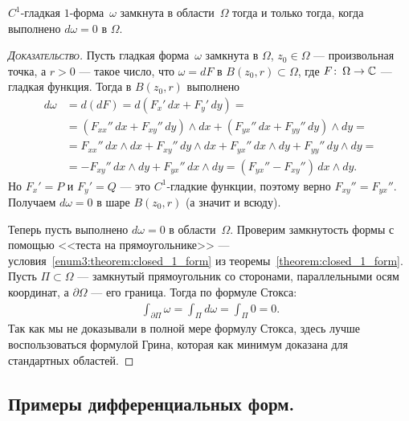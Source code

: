 \documentclass[../complex-analysis.tex]{subfiles}
\begin{document}
\begin{thm}
 \label{theorem:smooth_form_closed}
 $ C^{1} $-гладкая $ 1 $-форма~$ \omega $ замкнута в области~$ \Omega $ тогда и только тогда, когда выполнено $ d \omega = 0 $ в $ \Omega $.
\end{thm}
\begin{proof}[\normalfont\textsc{Доказательство}]
 Пусть гладкая форма~$ \omega $ замкнута в $ \Omega $, $ z_0 \in \Omega $ --- произвольная точка, а $ r > 0 $ --- такое число, что $ \omega = d F $ в $ B(z_0,r) \subset \Omega $, где $ F \colon\,\Omega\to\mathbb{C} $ --- гладкая функция. Тогда в $ B(z_0,r) $ выполнено
 \begin{align*}
  d\omega&=d(dF) = d \left( F_x'\,dx + F_y'\,dy \right) = \\
  &= \left( F_{x x}''\,dx + F_{x y}''\,dy \right)\land dx + \left( F_{y x}''\,dx + F_{y y}''\,dy \right)\land dy = \\
  &= F_{x x}''\,dx \land dx + F_{xy}''\,dy \land dx + F_{yx}''\,dx\land dy + F_{y y}''\,dy \land dy = \\
  &= -F_{xy}''\,dx\land dy + F_{yx}''\,dx \land dy = (F_{yx}'' - F_{xy}'')\,dx\land dy.
 \end{align*} Но $ F_x' = P $ и $ F_y' = Q $ --- это $ C^{1} $-гладкие функции, поэтому верно $ F_{xy}'' = F_{yx}'' $. Получаем $ d\omega=0 $ в шаре $ B(z_0,r) $ (а значит и всюду).

 Теперь пусть выполнено $d \omega = 0$ в области~$\Omega$. Проверим замкнутость формы с помощью <<теста на прямоугольнике>> --- условия~\ref{enum3:theorem:closed_1_form} из теоремы~\ref{theorem:closed_1_form}. Пусть $ \Pi \subset \Omega $ --- замкнутый прямоугольник со сторонами, параллельными осям координат, а $ \partial\Omega $ --- его граница. Тогда по формуле Стокса:
 \begin{align*}
  \int_{\partial\Pi} \omega = \int_{\Pi} d\omega = \int_{\Pi} 0 = 0. 
 \end{align*} Так как мы не доказывали в полной мере формулу Стокса, здесь лучше воспользоваться формулой Грина, которая как минимум доказана для стандартных областей.
\end{proof}

\subsection{Примеры дифференциальных форм.}
\end{document}
